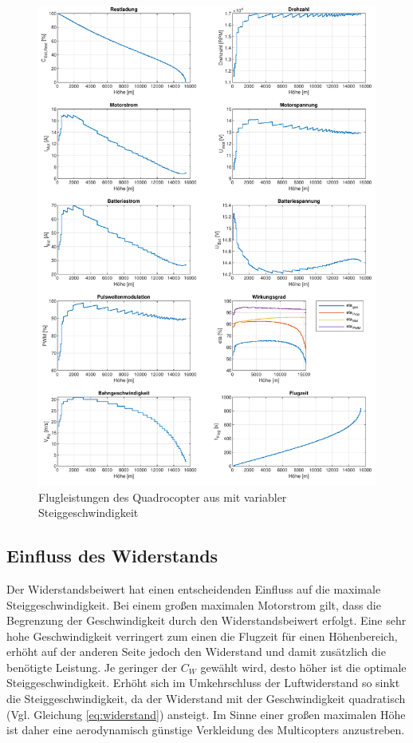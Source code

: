 \begin{figure}[H]
\centering
	\includegraphics[scale=0.7]{Diagramme/Russland_vvar.pdf}
	\caption{Flugleistungen des Quadrocopter aus \cite{Anderson.2018} mit variabler Steiggeschwindigkeit}
	\label{abb:fp}
\end{figure}


\subsection{Einfluss des Widerstands}
\label{subsec:widerstandseinfluss}
Der Widerstandsbeiwert hat einen entscheidenden Einfluss auf die maximale Steiggeschwindigkeit. Bei einem großen maximalen Motorstrom gilt, dass die Begrenzung der Geschwindigkeit durch den Widerstandsbeiwert erfolgt. Eine sehr hohe Geschwindigkeit verringert zum einen die Flugzeit für einen Höhenbereich, erhöht auf der anderen Seite jedoch den Widerstand und damit zusätzlich die benötigte Leistung. Je geringer der \ensuremath{C_W} gewählt wird, desto höher ist die optimale Steiggeschwindigkeit. Erhöht sich im Umkehrschluss der Luftwiderstand so sinkt die Steiggeschwindigkeit, da der Widerstand mit der Geschwindigkeit quadratisch (Vgl. Gleichung \ref{eq:widerstand}) ansteigt. Im Sinne einer großen maximalen Höhe ist daher eine aerodynamisch günstige Verkleidung des Multicopters anzustreben.
  
